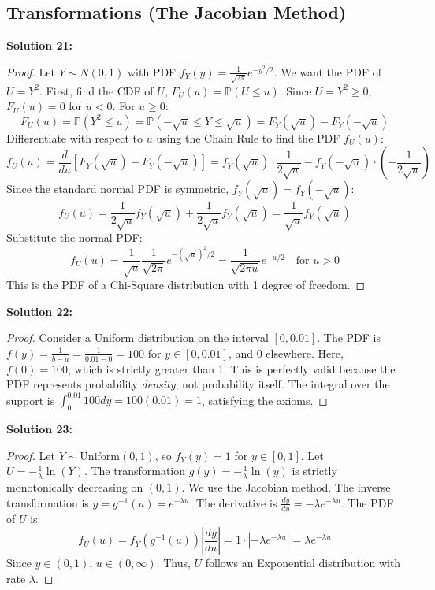 \documentclass[11pt, a4paper]{article}
\theoremstyle{definition}
\theoremstyle{remark}
\newcommand{\Prob}{\mathbb{P}}
\begin{document}
\subsection{Transformations (The Jacobian Method)}

\textbf{Solution 21:}
\begin{proof}
Let $Y \sim N(0,1)$ with PDF $f_Y(y) = \frac{1}{\sqrt{2\pi}} e^{-y^2/2}$. We want the PDF of $U = Y^2$.
First, find the CDF of $U$, $F_U(u) = \Prob(U \le u)$. Since $U = Y^2 \ge 0$, $F_U(u) = 0$ for $u < 0$.
For $u \ge 0$:
\[ F_U(u) = \Prob(Y^2 \le u) = \Prob(-\sqrt{u} \le Y \le \sqrt{u}) = F_Y(\sqrt{u}) - F_Y(-\sqrt{u}) \]
Differentiate with respect to $u$ using the Chain Rule to find the PDF $f_U(u)$:
\[ f_U(u) = \frac{d}{du} \left[ F_Y(\sqrt{u}) - F_Y(-\sqrt{u}) \right] = f_Y(\sqrt{u}) \cdot \frac{1}{2\sqrt{u}} - f_Y(-\sqrt{u}) \cdot \left(-\frac{1}{2\sqrt{u}}\right) \]
Since the standard normal PDF is symmetric, $f_Y(\sqrt{u}) = f_Y(-\sqrt{u})$:
\[ f_U(u) = \frac{1}{2\sqrt{u}} f_Y(\sqrt{u}) + \frac{1}{2\sqrt{u}} f_Y(\sqrt{u}) = \frac{1}{\sqrt{u}} f_Y(\sqrt{u}) \]
Substitute the normal PDF:
\[ f_U(u) = \frac{1}{\sqrt{u}} \frac{1}{\sqrt{2\pi}} e^{-(\sqrt{u})^2/2} = \frac{1}{\sqrt{2\pi u}} e^{-u/2} \quad \text{for } u > 0 \]
This is the PDF of a Chi-Square distribution with 1 degree of freedom.
\end{proof}

\textbf{Solution 22:}
\begin{proof}
Consider a Uniform distribution on the interval $[0, 0.01]$. 
The PDF is $f(y) = \frac{1}{b-a} = \frac{1}{0.01 - 0} = 100$ for $y \in [0, 0.01]$, and $0$ elsewhere.
Here, $f(0) = 100$, which is strictly greater than 1. 
This is perfectly valid because the PDF represents probability \textit{density}, not probability itself. The integral over the support is $\int_0^{0.01} 100 dy = 100(0.01) = 1$, satisfying the axioms.
\end{proof}

\textbf{Solution 23:}
\begin{proof}
Let $Y \sim \text{Uniform}(0,1)$, so $f_Y(y) = 1$ for $y \in [0,1]$. Let $U = -\frac{1}{\lambda} \ln(Y)$.
The transformation $g(y) = -\frac{1}{\lambda} \ln(y)$ is strictly monotonically decreasing on $(0,1)$.
We use the Jacobian method. The inverse transformation is $y = g^{-1}(u) = e^{-\lambda u}$.
The derivative is $\frac{dy}{du} = -\lambda e^{-\lambda u}$.
The PDF of $U$ is:
\[ f_U(u) = f_Y(g^{-1}(u)) \left| \frac{dy}{du} \right| = 1 \cdot \left| -\lambda e^{-\lambda u} \right| = \lambda e^{-\lambda u} \]
Since $y \in (0,1)$, $u \in (0, \infty)$. Thus, $U$ follows an Exponential distribution with rate $\lambda$.
\end{proof}
\end{document}

